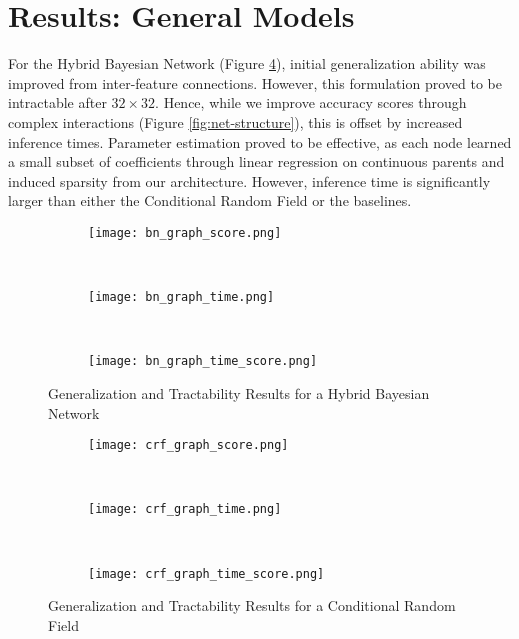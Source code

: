 \documentclass{article}
\begin{document}

\section{Results: General Models}
\label{sec:results-general}
For the Hybrid Bayesian Network (Figure \ref{fig:HBN}), initial generalization
ability was improved from inter-feature connections.
However, this formulation proved to be intractable
after $32 \times 32$. Hence, while we improve accuracy scores through
complex interactions (Figure \ref{fig:net-structure}), this is
offset by increased inference times. Parameter estimation proved to be effective,
as each node learned a small subset of coefficients through linear regression
on continuous parents and induced sparsity from our architecture.
However, inference time is significantly larger than either the
Conditional Random Field or the baselines.

\begin{figure}
  \centering
  \begin{subfigure}[b]{0.3\textwidth}
    \centering
    \texttt{[image: bn\_graph\_score.png]}
    \caption*{}
    \label{fig:bn_graph_score}
  \end{subfigure}
  ~
  \begin{subfigure}[b]{0.3\textwidth}
    \centering
    \texttt{[image: bn\_graph\_time.png]}
    \caption*{}
    \label{fig:bn_graph_time}
  \end{subfigure}
  ~
  \begin{subfigure}[b]{0.3\textwidth}
    \centering
    \texttt{[image: bn\_graph\_time\_score.png]}
    \caption*{}
    \label{fig:bn_graph_time_score}
  \end{subfigure}
  \vspace{-20pt}
  \caption{Generalization and Tractability Results for a Hybrid Bayesian Network}
  \label{fig:HBN}
\end{figure}

\begin{figure}
  \centering
  \begin{subfigure}[b]{0.3\textwidth}
    \centering
    \texttt{[image: crf\_graph\_score.png]}
    \caption*{}
    \label{fig:crf_graph_score}
  \end{subfigure}
  ~
  \begin{subfigure}[b]{0.3\textwidth}
    \centering
    \texttt{[image: crf\_graph\_time.png]}
    \caption*{}
    \label{fig:crf_graph_time}
  \end{subfigure}
  ~
  \begin{subfigure}[b]{0.3\textwidth}
    \centering
    \texttt{[image: crf\_graph\_time\_score.png]}
    \caption*{}
    \label{fig:crf_graph_time_score}
  \end{subfigure}
  \vspace{-20pt}
  \caption{Generalization and Tractability Results for a Conditional Random Field}
  \label{fig:CRF}
\end{figure}
\end{document}
